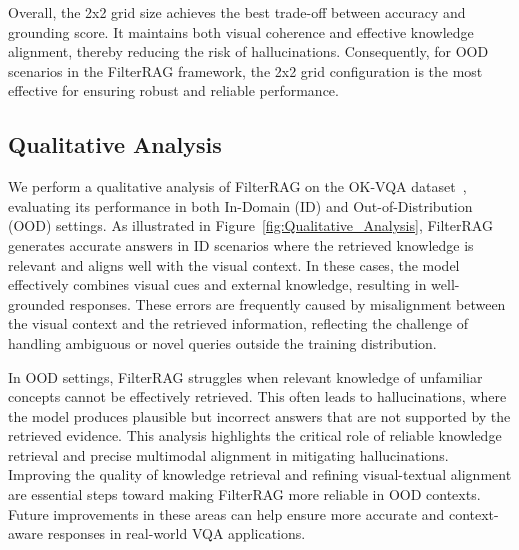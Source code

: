 Overall, the 2x2 grid size achieves the best trade-off between accuracy and grounding score. It maintains both visual coherence and effective knowledge alignment, thereby reducing the risk of hallucinations. Consequently, for OOD scenarios in the FilterRAG framework, the 2x2 grid configuration is the most effective for ensuring robust and reliable performance.

\subsection{Qualitative Analysis}
We perform a qualitative analysis of FilterRAG on the OK-VQA dataset~\cite{marino2019ok}, evaluating its performance in both In-Domain (ID) and Out-of-Distribution (OOD) settings. As illustrated in Figure~\ref{fig:Qualitative_Analysis}, FilterRAG generates accurate answers in ID scenarios where the retrieved knowledge is relevant and aligns well with the visual context. In these cases, the model effectively combines visual cues and external knowledge, resulting in well-grounded responses. These errors are frequently caused by misalignment between the visual context and the retrieved information, reflecting the challenge of handling ambiguous or novel queries outside the training distribution.

In OOD settings, FilterRAG struggles when relevant knowledge of unfamiliar concepts cannot be effectively retrieved. This often leads to hallucinations, where the model produces plausible but incorrect answers that are not supported by the retrieved evidence. This analysis highlights the critical role of reliable knowledge retrieval and precise multimodal alignment in mitigating hallucinations. Improving the quality of knowledge retrieval and refining visual-textual alignment are essential steps toward making FilterRAG more reliable in OOD contexts. Future improvements in these areas can help ensure more accurate and context-aware responses in real-world VQA applications.
